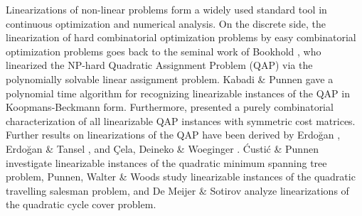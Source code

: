 Linearizations of non-linear problems form a widely used standard tool in continuous 
optimization and numerical analysis.
On the discrete side, the linearization of hard combinatorial optimization problems by easy 
combinatorial optimization problems goes back to the seminal work of Bookhold \cite{bookhold1990contribution}, 
who linearized the NP-hard Quadratic Assignment Problem (QAP) via the polynomially solvable 
linear assignment problem.
Kabadi \& Punnen \cite{kabadi2011n,punnen2013linear} gave a polynomial time algorithm for recognizing 
linearizable instances of the QAP in Koopmans-Beckmann form.
Furthermore, \cite{punnen2013linear} presented a purely combinatorial characterization of all linearizable
QAP instances with symmetric cost matrices.
Further results on linearizations of the QAP have been derived by
Erdo\u{g}an \cite{Erdogan2006}, Erdo\u{g}an \& Tansel \cite{ErTa2007,ErTa2011}, and 
\c{C}ela, Deineko \& Woeginger \cite{CeDeWo2016}.
{\'C}usti{\'c} \& Punnen \cite{CuPu2018} investigate linearizable instances of the quadratic minimum spanning tree problem,
Punnen, Walter \& Woods \cite{PuWaWo2017} study linearizable instances of the quadratic travelling salesman problem, and
De Meijer \& Sotirov \cite{deMeSo2020} analyze linearizations of the quadratic cycle cover problem.

